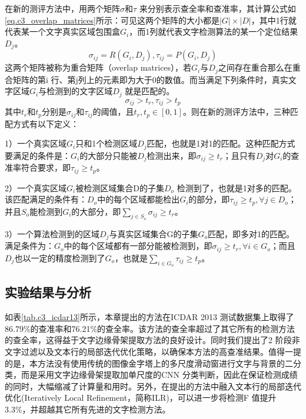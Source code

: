         在新的测评方法中，用两个矩阵$\sigma$和$\tau$ 来分别表示查全率和查准率，其计算公式如\ref{eq.c3_overlap_matrices}所示：可见这两个矩阵的大小都是$|G|\times|D|$，其中1行就代表某一个文字真实区域包围盒$G_i$，而1列就代表文字检测算法的某一个定位结果$D_j$。
        \begin{equation}
        \sigma_{ij}=R(G_i,D_j),\tau_{ij}=P(G_i,D_j)
        \label{eq.c3_overlap_matrices}
        \end{equation}
        这两个矩阵被称为重合矩阵（overlap matrices），若$G_i$与$D_j$之间存在重合那么在重合矩阵的第i 行、第j列上的元素即为大于0的数值。而当满足下列条件时，真实文字区域$G_i$与检测到的文字区域$D_j$ 就是匹配的。
        \begin{equation}
        \sigma_{ij}>t_r,\tau_{ij}>t_p
        \end{equation}
        其中$t_r$和$t_p$分别是$\sigma_{ij}$和$\tau_{ij}$的阈值，且$t_r,t_p \in [0,1]$。则在新的测评方法中，三种匹配方式有以下定义：

        1）一个真实区域$G_i$只和1个检测区域$D_j$匹配，也就是1对1的匹配。这种匹配方式要满足的条件是：$G_i$的大部分只能被$D_j$检测出来，即$\sigma_{ij} \ge t_r$；且只有$D_j$对$G_i$的查准率符合要求，即$\tau_{ij} \ge t_p$。

        2）一个真实区域$G_i$被检测区域集合D的子集$D_o$ 检测到了，也就是1对多的匹配。该匹配满足的条件有：$D_o$中的每个区域都能检出$G_i$的部分，即$\tau_{ij} \ge t_p,\forall j \in D_o$；并且$S_o$能检测到$G_i$的大部分，即$\sum_{j \in S_o} \sigma_{ij} \ge t_r$。
        
        3）一个算法检测到的区域$D_j$与真实区域集合G的子集$G_o$匹配，即多对1的匹配。满足条件为：$G_o$中的每个区域都有一部分能被检测到，即$\sigma_{ij} \ge t_r,\forall i \in G_o$；而且$D_j$也以一定的精度检测到了$G_o$，也就是$\sum_{i \in G_o} \tau_{ij} \ge t_p$。

        \subsection{实验结果与分析}

        如表\ref{tab.c3_icdar13}所示，本章提出的方法在ICDAR 2013 测试数据集上取得了86.79\%的查准率和76.21\%的查全率。该方法的查全率超过了其它所有的检测方法的查全率，这得益于文字边缘骨架提取方法的良好设计。同时我们提出了2 阶段非文字过滤以及文本行的局部迭代优化策略，以确保本方法的高查准结果。值得一提的是，本方法没有使用传统的图像金字塔上的多尺度滑动窗进行文字与背景的二分类，而是采用文字边缘骨架提取加单尺度的CNN 分类判断，因此在保证检测成绩的同时，大幅缩减了计算量和用时。另外，在提出的方法中融入文本行的局部迭代优化(Iteratively Local Refinement，简称ILR)，可以进一步将检测F 值提升3.3\%，并超越其它所有先进的文字检测方法。


